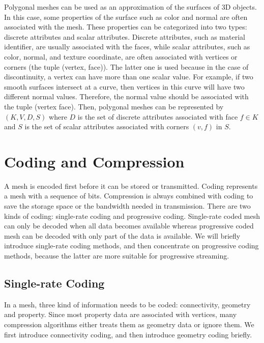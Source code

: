     Polygonal meshes can be used as an approximation of the surfaces
    of 3D objects. In this case, some properties of the surface such
    as color and normal are often associated with the mesh. These
    properties can be categorized into two types: discrete attributes
    and scalar attributes\label{property}. Discrete attributes, such
    as material identifier, are usually associated with the faces, while
    scalar attributes, such as color, normal, and texture coordinate,
    are often associated with vertices or corners (the tuple (vertex,
    face)). The latter one is used because in the case of
    discontinuity, a vertex can have more than one scalar value. For
    example, if two smooth surfaces intersect at a curve, then vertices
    in this curve will have two different normal values. Therefore,
    the normal value should be associated with the tuple (vertex face).
    Then, polygonal meshes can be represented by $(K, V, D, S)$ where
    $D$ is the set of discrete attributes associated with face $f \in
    K$ and $S$ is the set of scalar attributes associated with corners $(v, f)$ in $S$.

    \section{Coding and Compression}
    A mesh is encoded first before it can be stored or
    transmitted. Coding represents a mesh with a sequence of
    bits. Compression is always combined with coding to save the storage space
    or the bandwidth needed in transmission. 
    There are two kinds of coding:
    single-rate coding and progressive coding. 
    Single-rate coded mesh can only be decoded when all data becomes available 
    whereas progressive coded mesh can be decoded with only part of the data is available. 
    We will briefly introduce single-rate coding methods, and then concentrate on
    progressive coding methods, because the latter are more suitable for progressive streaming.
    
    \subsection{Single-rate Coding} \label{single_rate}
    In a mesh, three kind of information needs to be coded:
    connectivity, geometry and property. 
    Since most property data are associated with vertices, 
    many compression algorithms either treats them as geometry data or 
    ignore them. We first introduce connectivity coding, 
    and then introduce geometry coding briefly.
    

